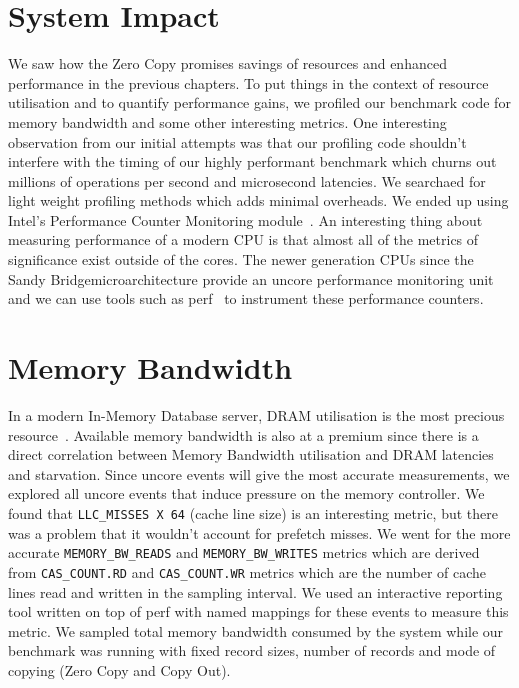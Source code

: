 

\section{System Impact}
\label{sec:impact}

We saw how the Zero Copy promises savings of resources and enhanced performance 
in the previous chapters. To put things in the context of resource utilisation and
 to quantify performance gains, we profiled our benchmark code for memory bandwidth 
 and some other interesting metrics. One interesting observation from our initial 
 attempts was that our profiling code shouldn't interfere with the timing of our highly performant 
 benchmark which churns out millions of operations per second and microsecond latencies. 
 We searchaed for light weight profiling methods which adds minimal overheads.
 We ended up using Intel\textregistered's Performance Counter Monitoring module~\cite{intelpcm}. 
 An interesting thing about measuring performance 
 of a modern CPU is that almost all of the metrics of significance exist outside of the cores.
 The newer generation CPUs since the Sandy Bridge\textregistered microarchitecture provide an uncore performance 
 monitoring unit and we can use tools such as perf~\cite{perftool} to instrument these performance 
 counters. 

\section{Memory Bandwidth}
In a modern In-Memory Database server, DRAM utilisation is the most precious resource~\cite{ramcloudfast}. 
 Available memory bandwidth is also at a premium since there is a direct correlation between Memory Bandwidth
 utilisation and DRAM latencies and starvation. Since uncore events will give the most accurate measurements,
 we explored all uncore events that induce pressure on the memory controller. We found that 
\texttt{LLC\_MISSES X 64} (cache line size) is an interesting metric, but there was a problem that it wouldn't account for prefetch 
 misses. We went for the more accurate \texttt{MEMORY\_BW\_READS} and \texttt{MEMORY\_BW\_WRITES} metrics which are derived from 
 \texttt{CAS\_COUNT.RD} and \texttt{CAS\_COUNT.WR} metrics which are the number of cache lines read and written in the sampling 
 interval. We used an interactive reporting tool written on top of perf with named mappings for these events
 to measure this metric. We sampled total memory bandwidth consumed by the system while our benchmark 
 was running with fixed record sizes, number of records and mode of copying (Zero Copy and Copy Out).

